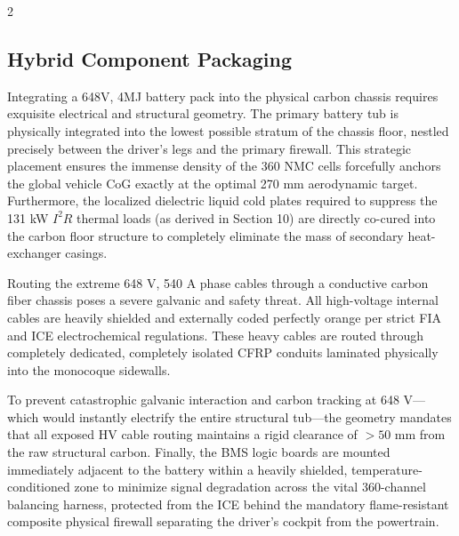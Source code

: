 \begin{multicols}{2}
\subsection{Hybrid Component Packaging}

Integrating a 648V, 4MJ battery pack into the physical carbon chassis requires exquisite electrical and structural geometry. The primary battery tub is physically integrated into the lowest possible stratum of the chassis floor, nestled precisely between the driver's legs and the primary firewall. This strategic placement ensures the immense density of the 360 NMC cells forcefully anchors the global vehicle CoG exactly at the optimal 270 mm aerodynamic target. Furthermore, the localized dielectric liquid cold plates required to suppress the 131 kW $I^2R$ thermal loads (as derived in Section 10) are directly co-cured into the carbon floor structure to completely eliminate the mass of secondary heat-exchanger casings.

Routing the extreme 648 V, 540 A phase cables through a conductive carbon fiber chassis poses a severe galvanic and safety threat. All high-voltage internal cables are heavily shielded and externally coded perfectly orange per strict FIA and ICE electrochemical regulations. These heavy cables are routed through completely dedicated, completely isolated CFRP conduits laminated physically into the monocoque sidewalls. 

To prevent catastrophic galvanic interaction and carbon tracking at 648 V—which would instantly electrify the entire structural tub—the geometry mandates that all exposed HV cable routing maintains a rigid clearance of $>50$ mm from the raw structural carbon. Finally, the BMS logic boards are mounted immediately adjacent to the battery within a heavily shielded, temperature-conditioned zone to minimize signal degradation across the vital 360-channel balancing harness, protected from the ICE behind the mandatory flame-resistant composite physical firewall separating the driver's cockpit from the powertrain.
\end{multicols}
